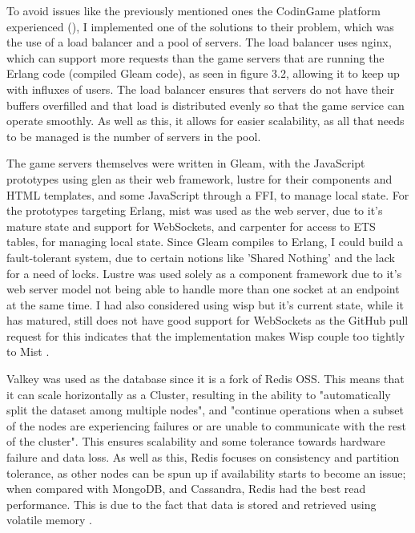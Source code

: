 \documentclass[]{final}
\begin{document}
To avoid issues like the previously mentioned ones the CodinGame platform
experienced {\hypersetup{linkcolor=teal}(\pageref{rationale_problem})}, I
implemented one of the
solutions to their problem, which was the use of a load balancer and a pool
of servers\cite{jobert_story_2017}. The load balancer uses nginx, which can
support more requests
than the game servers that are running the Erlang code (compiled Gleam code),
as seen in figure 3.2, allowing it to keep up with influxes of users.
The load balancer ensures that servers do not have their buffers overfilled
and that load is distributed evenly so that the game service can operate smoothly.
As well as this, it allows for easier scalability, as all that needs to be managed is the
number of servers in the pool.


The game servers themselves were written in Gleam, with the JavaScript prototypes
using glen as their web framework, lustre for their components and HTML templates,
and some JavaScript through a FFI, to manage local state. For the prototypes
targeting Erlang, mist was used as the web server, due to it's mature state
and support for WebSockets, and carpenter for access to ETS tables, for managing
local state. Since Gleam compiles to Erlang, I could build a fault-tolerant
system, due to certain notions like 'Shared Nothing' and the lack for a need
of locks. Lustre was used solely as a component framework due to it's web server model
not being able to handle more than one socket at an endpoint at the same time.
I had also considered using wisp but it's current state, while it has matured, still
does not have good support for WebSockets as the GitHub pull request for this indicates
that the implementation makes Wisp couple too tightly to Mist \cite{noauthor_WebSockets_nodate}.

\label{valkeyRead}

Valkey was used as the database since it is a fork of Redis OSS.
This means that it can scale horizontally as a Cluster, resulting in
the ability to "automatically split the dataset among multiple nodes", and
"continue operations when a subset of the nodes are experiencing failures
or are unable to communicate with the rest of the cluster"\cite{noauthor_scale_nodate}.
This ensures scalability and some tolerance towards hardware failure and data loss.
As well as this, Redis focuses on consistency and partition tolerance, as other nodes
can be spun up if availability starts to become an issue; when compared with
MongoDB, and Cassandra, Redis had the best read performance. This is due to the fact that data is stored and retrieved using
volatile memory \cite{department_of_information_systems_university_of_nizwa_sultanate_of_oman_study_2022}.
\end{document}
